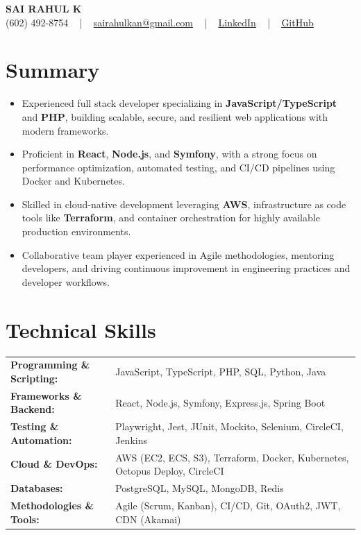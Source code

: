 \documentclass[letterpaper,11pt]{article}
\newcommand{\resumeItem}[1]{
  \item\footnotesize{
    {#1 \vspace{-2pt}}
  }
}
\newcommand{\resumeItemListStart}{\begin{itemize}[leftmargin=*]}
\newcommand{\resumeItemListEnd}{\end{itemize}\vspace{-5pt}}
\begin{document}
\begin{center}
    {\fontsize{14pt}{12pt}\selectfont \textbf{\MakeUppercase{Sai Rahul K}}}\\ \vspace{2pt}
    \fontsize{10pt}{12pt}\selectfont (602) 492-8754 ~ | ~ \href{mailto:sairahulkan@gmail.com}{sairahulkan@gmail.com} ~ | ~
    \href{https://www.linkedin.com/in/rq123/}{\color{blue}\underline{LinkedIn}} ~ | ~
    \href{https://github.com/kanrahuldo}{\color{blue}\underline{GitHub}}~
    \vspace{-8pt}
\end{center}

\section{Summary}
\fontsize{9pt}{10pt}\selectfont
\resumeItemListStart
    \resumeItem{Experienced full stack developer specializing in \textbf{JavaScript/TypeScript} and \textbf{PHP}, building scalable, secure, and resilient web applications with modern frameworks.}
    \resumeItem{Proficient in \textbf{React}, \textbf{Node.js}, and \textbf{Symfony}, with a strong focus on performance optimization, automated testing, and CI/CD pipelines using Docker and Kubernetes.}
    \resumeItem{Skilled in cloud-native development leveraging \textbf{AWS}, infrastructure as code tools like \textbf{Terraform}, and container orchestration for highly available production environments.}
    \resumeItem{Collaborative team player experienced in Agile methodologies, mentoring developers, and driving continuous improvement in engineering practices and developer workflows.}
\resumeItemListEnd
\vspace{-6pt}

\section{Technical Skills}
        \vspace{-14pt}
        \begin{table}[h]
            \fontsize{9pt}{10pt}\selectfont
            \begin{tabular}{p{0.3\linewidth} p{0.7\linewidth}}
                \textbf{Programming \& Scripting:} & JavaScript, TypeScript, PHP, SQL, Python, Java \\
                \textbf{Frameworks \& Backend:} & React, Node.js, Symfony, Express.js, Spring Boot \\
                \textbf{Testing \& Automation:} & Playwright, Jest, JUnit, Mockito, Selenium, CircleCI, Jenkins \\
                \textbf{Cloud \& DevOps:} & AWS (EC2, ECS, S3), Terraform, Docker, Kubernetes, Octopus Deploy, CircleCI \\
                \textbf{Databases:} & PostgreSQL, MySQL, MongoDB, Redis \\
                \textbf{Methodologies \& Tools:} & Agile (Scrum, Kanban), CI/CD, Git, OAuth2, JWT, CDN (Akamai) \\
            \end{tabular}
        \end{table}
    \vspace{-15pt}
\end{document}
